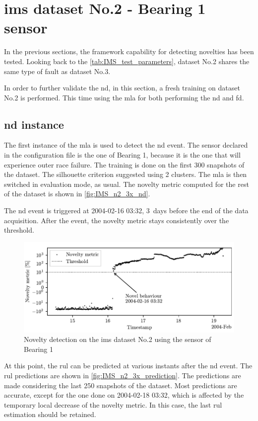 \section{\gls{ims} dataset No.2 - Bearing 1 sensor}
\label{sec:IMS_n2_3x}

In the previous sections, the framework capability for detecting novelties has been tested. Looking back to the \autoref{tab:IMS_test_parameters}, dataset No.2 shares the same type of fault as dataset No.3.

In order to further validate the \gls{nd}, in this section, a fresh training on dataset No.2 is performed. This time using the \gls{mla} for both performing the \gls{nd} and \gls{fd}.

\subsection{\gls{nd} instance}
The first instance of the \gls{mla} is used to detect the \gls{nd} event. The sensor declared in the configuration file is the one of Bearing 1, because it is the one that will experience outer race failure. The training is done on the first 300 snapshots of the dataset. The silhouette criterion suggested using 2 clusters. The \gls{mla} is then switched in evaluation mode, as usual. The novelty metric computed for the rest of the dataset is shown in \autoref{fig:IMS_n2_3x_nd}. 

The \gls{nd} event is triggered at 2004-02-16 03:32, 3~days before the end of the data acquisition. After the event, the novelty metric stays consistently over the threshold. 

\begin{figure}
    \centering
    \includegraphics{images/IMS/Test02/ND.pdf}
    \caption{Novelty detection on the \gls{ims} dataset No.2 using the sensor of Bearing 1}
    \label{fig:IMS_n2_3x_nd}
\end{figure}

At this point, the \gls{rul} can be predicted at various instants after the \gls{nd} event. The \gls{rul} predictions are shown in \autoref{fig:IMS_n2_3x_prediction}. The predictions are made considering the last 250 snapshots of the dataset. Most predictions are accurate, except for the one done on 2004-02-18 03:32, which is affected by the temporary local decrease of the novelty metric. In this case, the last \gls{rul} estimation should be retained.

